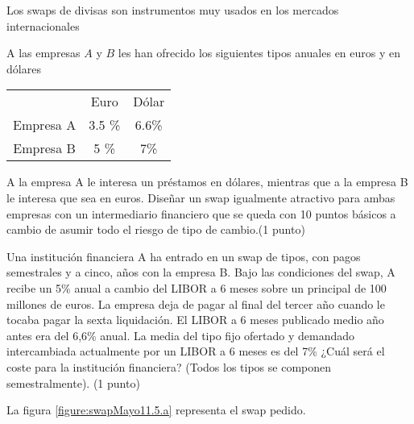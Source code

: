 \begin{problem}[5]
Los swaps de divisas son instrumentos muy usados en los mercados internacionales

\ppart A las empresas $A$ y $B$ les han ofrecido los siguientes tipos anuales en euros y en dólares

\begin{center}
\begin{tabular}{ccc}
\hline
& Euro & Dólar \\
Empresa A & 3.5 \% & 6.6\% \\
Empresa B & 5 \% & 7\% \\
\hline
\end{tabular}
\end{center}

A la empresa A le interesa un préstamos en dólares, mientras que a la empresa B le interesa que
sea en euros. Diseñar un swap igualmente atractivo para ambas empresas con un intermediario
financiero que se queda con 10 puntos básicos a cambio de asumir todo el riesgo de tipo de
cambio.(1 punto)

\ppart Una institución financiera A ha entrado en un swap de tipos, con pagos semestrales y a cinco,
años con la empresa B. Bajo las condiciones del swap, A recibe un 5\% anual a cambio del
LIBOR a 6 meses sobre un principal de 100 millones de euros. La empresa deja de pagar
al final del tercer año cuando le tocaba pagar la sexta liquidación. El LIBOR a 6 meses
publicado medio año antes era del 6,6\% anual. La media del tipo fijo ofertado y demandado
intercambiada actualmente por un LIBOR a 6 meses es del 7\% ¿Cuál será el coste para la
institución financiera? (Todos los tipos se componen semestralmente). (1 punto)

\solution


\spart

La figura \ref{figure:swapMayo11.5.a} representa el swap pedido.

\begin{figure}[hbpt]
\centering
{}
\end{figure}
\end{problem}
